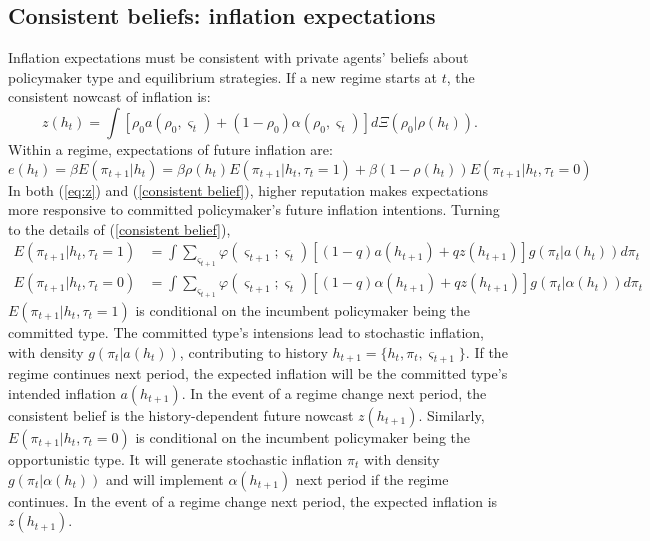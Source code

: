 \documentclass[12pt,letter,leqno]{article}
\theoremstyle{asn}
\theoremstyle{lem}
\theoremstyle{slem}
\theoremstyle{prop}
\theoremstyle{appprop}
\theoremstyle{rem}
\theoremstyle{defn}
\begin{document}
\subsection{Consistent beliefs: inflation expectations}
Inflation expectations must be consistent with private agents' beliefs about policymaker type and equilibrium strategies. If a new regime starts at $t$, the consistent nowcast of inflation is:
\begin{equation}\label{eq:z}
    z(h_t) =\int \left[ \rho_0 a(\rho_0,\varsigma_t) + (1-\rho_0) \alpha(\rho_0,\varsigma_t) \right]d\Xi(\rho_0|\rho(h_t)).
\end{equation}
Within a regime, expectations of future inflation are:
\begin{equation}
e(h_{t})=\beta E(\pi_{t+1}|h_t) =\beta \rho (h_{t})E(\pi _{t+1}|h_{t},\tau_{t}=1)+\beta (1-\rho
(h_{t}))E(\pi _{t+1}|h_{t},\tau_{t}=0)  \label{consistent belief}
\end{equation}
In both (\ref{eq:z}) and (\ref{consistent belief}), higher reputation makes expectations more responsive to committed policymaker's future inflation intentions. Turning to the details of (\ref{consistent belief}),
\begin{align}
\nonumber
E(\pi _{t+1}|h_{t},\tau_{t}=1)& =\int \sum_{\varsigma _{t+1}}\varphi
(\varsigma _{t+1};\varsigma _{t})\left[ \left( 1-q\right)
a(h_{t+1})+qz\left( h_{t+1}\right) \right] g(\pi _{t}|a(h_{t}))d\pi _{t} 
\nonumber \\
E(\pi _{t+1}|h_{t},\tau_{t}=0)& =\int \sum_{\varsigma _{t+1}}\varphi
(\varsigma _{t+1};\varsigma _{t})\left[ \left( 1-q\right) \alpha
(h_{t+1})+qz\left( h_{t+1}\right) \right] g(\pi _{t}|\alpha (h_{t}))d\pi _{t}
\nonumber
\end{align}
$E(\pi _{t+1}|h_{t},\tau_{t}=1)$ is conditional on the incumbent policymaker being the committed type. The committed type's intensions lead to stochastic inflation, with density $g(\pi_t|a(h_t))$, contributing to history $h_{t+1}=\{ h_t,\pi_t,\varsigma_{t+1} \}$. If the regime continues next period, the expected inflation will be the committed type's intended inflation $a(h_{t+1})$. In the event of a regime change next period, the consistent belief is the history-dependent future nowcast $z(h_{t+1})$. Similarly, $E(\pi _{t+1}|h_{t},\tau_{t}=0)$ is conditional on the incumbent policymaker being the opportunistic type. It will generate stochastic inflation $\pi_{t}$ with density $g(\pi_{t}|\alpha(h_{t}))$ and will implement $\alpha(h_{t+1})$ next period if the regime continues.
In the event of a regime change next period, the expected inflation is $z(h_{t+1})$.
\end{document}
